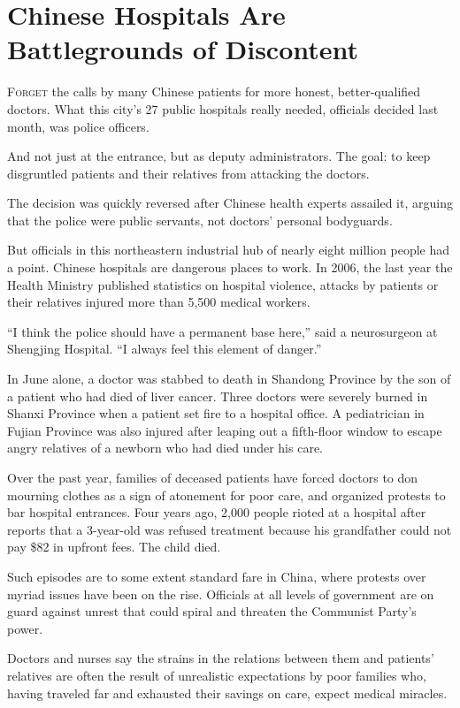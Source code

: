 ﻿\documentclass[12pt]{article}
\begin{document}
\section{Chinese Hospitals Are Battlegrounds of Discontent}

\lettrine{F}{orget} the calls by many Chinese patients for more honest,
better-qualified doctors. What this city's 27 public hospitals really needed, officials decided last
month, was police officers.

And not just at the entrance, but as deputy administrators. The goal: to keep disgruntled patients
and their relatives from attacking the doctors.

The decision was quickly reversed after Chinese health experts assailed it, arguing that the police
were public servants, not doctors' personal bodyguards.

But officials in this northeastern industrial hub of nearly eight million people had a point.
Chinese hospitals are dangerous places to work. In 2006, the last year the Health Ministry published
statistics on hospital violence, attacks by patients or their relatives injured more than 5,500
medical workers.

``I think the police should have a permanent base here,'' said a neurosurgeon at Shengjing Hospital.
``I always feel this element of danger.''

In June alone, a doctor was stabbed to death in Shandong Province by the son of a patient who had
died of liver cancer. Three doctors were severely burned in Shanxi Province when a patient set fire
to a hospital office. A pediatrician in Fujian Province was also injured after leaping out a
fifth-floor window to escape angry relatives of a newborn who had died under his care.

Over the past year, families of deceased patients have forced doctors to don mourning clothes as a
sign of atonement for poor care, and organized protests to bar hospital entrances. Four years ago,
2,000 people rioted at a hospital after reports that a 3-year-old was refused treatment because his
grandfather could not pay \$82 in upfront fees. The child died.

Such episodes are to some extent standard fare in China, where protests over myriad issues have been
on the rise. Officials at all levels of government are on guard against unrest that could spiral and
threaten the Communist Party's power.

Doctors and nurses say the strains in the relations between them and patients' relatives are often
the result of unrealistic expectations by poor families who, having traveled far and exhausted their
savings on care, expect medical miracles.
\end{document}
